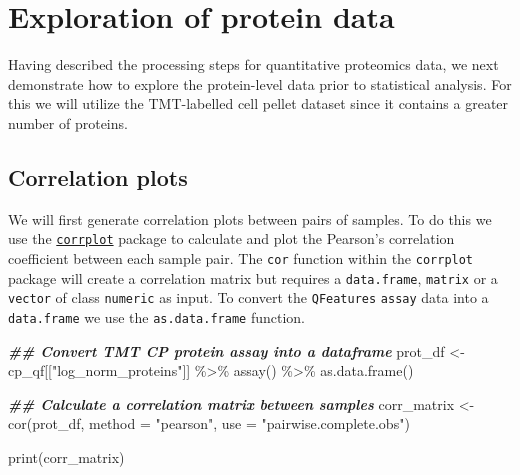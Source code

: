 \documentclass[9pt,a4paper,]{extarticle}
\newenvironment{Shaded}{\begin{snugshade}}{\end{snugshade}}
\newcommand{\AttributeTok}[1]{\textcolor[rgb]{0.77,0.63,0.00}{#1}}
\newcommand{\DocumentationTok}[1]{\textcolor[rgb]{0.56,0.35,0.01}{\textbf{\textit{#1}}}}
\newcommand{\FunctionTok}[1]{\textcolor[rgb]{0.00,0.00,0.00}{#1}}
\newcommand{\NormalTok}[1]{#1}
\newcommand{\OtherTok}[1]{\textcolor[rgb]{0.56,0.35,0.01}{#1}}
\newcommand{\SpecialCharTok}[1]{\textcolor[rgb]{0.00,0.00,0.00}{#1}}
\newcommand{\StringTok}[1]{\textcolor[rgb]{0.31,0.60,0.02}{#1}}
\begin{document}
\hypertarget{exploration-of-protein-data}{%
\section{Exploration of protein data}\label{exploration-of-protein-data}}

Having described the processing steps for quantitative proteomics data, we next
demonstrate how to explore the protein-level data prior to statistical analysis.
For this we will utilize the TMT-labelled cell pellet dataset since it contains
a greater number of proteins.

\hypertarget{correlation-plots}{%
\subsection{Correlation plots}\label{correlation-plots}}

We will first generate correlation plots between pairs of samples. To do this we
use the \href{https://cran.r-project.org/web/packages/corrplot/vignettes/corrplot-intro.html}{\texttt{corrplot}}
package to calculate and plot the Pearson's correlation coefficient between each
sample pair. The \texttt{cor} function within the \texttt{corrplot} package will create a
correlation matrix but requires a \texttt{data.frame}, \texttt{matrix} or a \texttt{vector} of class
\texttt{numeric} as input. To convert the \texttt{QFeatures} \texttt{assay} data into a \texttt{data.frame}
we use the \texttt{as.data.frame} function.

\begin{Shaded}
\begin{Highlighting}[]
\DocumentationTok{\#\# Convert TMT CP protein assay into a dataframe}
\NormalTok{prot\_df }\OtherTok{\textless{}{-}}\NormalTok{ cp\_qf[[}\StringTok{"log\_norm\_proteins"}\NormalTok{]] }\SpecialCharTok{\%\textgreater{}\%}
  \FunctionTok{assay}\NormalTok{() }\SpecialCharTok{\%\textgreater{}\%}
  \FunctionTok{as.data.frame}\NormalTok{()}

\DocumentationTok{\#\# Calculate a correlation matrix between samples}
\NormalTok{corr\_matrix }\OtherTok{\textless{}{-}} \FunctionTok{cor}\NormalTok{(prot\_df,}
                   \AttributeTok{method =} \StringTok{"pearson"}\NormalTok{,}
                   \AttributeTok{use =} \StringTok{"pairwise.complete.obs"}\NormalTok{)}

\FunctionTok{print}\NormalTok{(corr\_matrix)}
\end{Highlighting}
\end{Shaded}
\end{document}
